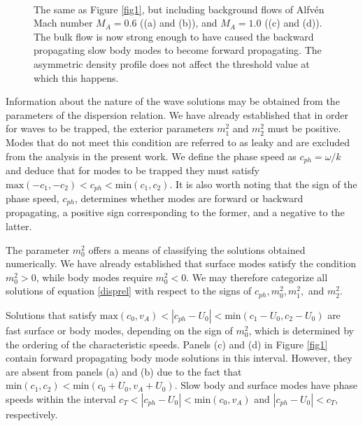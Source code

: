 \begin{figure}[t]
\centering
{}
\hspace{3pt}
\\
\hspace{3pt}
\caption{The same as Figure \ref{fig1}, but including background flows of Alfv\'en Mach number $M_A = 0.6$ ((a) and (b)), and $M_A = 1.0$ ((c) and (d)). The bulk flow is now strong enough to have caused the backward propagating slow body modes to become forward propagating. The asymmetric density profile does not affect the threshold value at which this happens.}
\label{fig2}
\end{figure}

Information about the nature of the wave solutions may be obtained from the parameters of the dispersion relation. We have already established that in order for waves to be trapped, the exterior parameters $m_1^2$ and $m_2^2$ must be positive. Modes that do not meet this condition are referred to as leaky and are excluded from the analysis in the present work. We define the phase speed as $c_{ph} = \omega / k$ and deduce that for modes to be trapped they must satisfy $\textrm{max}(-c_1, -c_2) < c_{ph} < \textrm{min}(c_1, c_2)$. It is also worth noting that the sign of the phase speed, $c_{ph}$, determines whether modes are forward or backward propagating, a positive sign corresponding to the former, and a negative to the latter.

The parameter $m_0^2$ offers a means of classifying the solutions obtained numerically. We have already established that surface modes satisfy the condition $m_0^2 > 0$, while body modes require $m_0^2 < 0$. We may therefore categorize all solutions of equation \eqref{disprel} with respect to the signs of $c_{ph}, m_0^2, m_1^2,$ and $m_2^2$.

Solutions that satisfy $\textrm{max}(c_0, v_A) < |c_{ph} - U_0| < \textrm{min}(c_1 - U_0, c_2 - U_0)$ are fast surface or body modes, depending on the sign of $m_0^2$, which is determined by the ordering of the characteristic speeds.
Panels (c) and (d) in Figure \ref{fig1} contain forward propagating body mode solutions in this interval.
However, they are absent from panels (a) and (b) due to the fact that $\textrm{min}(c_1, c_2) < \textrm{min}(c_0 + U_0, v_A + U_0)$.
Slow body and surface modes have phase speeds within the interval $c_T < |c_{ph} - U_0| < \textrm{min}(c_0, v_A)$ and $|c_{ph} - U_0| < c_T$, respectively.

